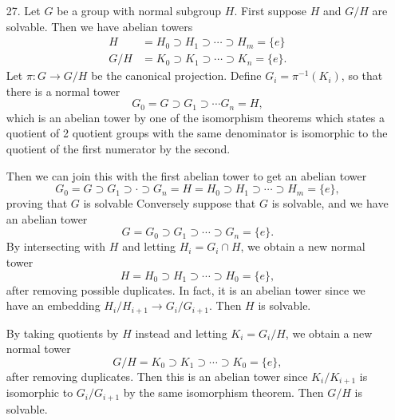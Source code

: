 \documentclass[11pt, reqno]{article}
\theoremstyle{plain}
\theoremstyle{definition}
\theoremstyle{remark}
\begin{document}
\begin{enumerate}
    \item[27.] Let $G$ be a group with normal subgroup $H$. First suppose $H$ and $G/H$ are solvable. Then
    we have abelian towers 
    \begin{align*}
        H & = H_0 \supset H_1 \supset \cdots \supset H_m = \{e\}\\
        G/H & = K_0 \supset K_1 \supset \cdots \supset K_n = \{e\}.
    \end{align*}
    Let $\pi: G \rightarrow G/H$ be the canonical projection. Define $G_i = \pi^{-1}(K_i)$, 
    so that there is a normal tower 
    \[
        G_0 = G \supset G_1 \supset \cdots G_n = H,
    \]
    which is an abelian tower by one of the isomorphism theorems which states a quotient of 
    2 quotient groups with the same denominator is isomorphic to the quotient of the first numerator 
    by the second. 

    Then we can join this with the first abelian tower to get an abelian tower 
    \[
        G_0 = G \supset G_1 \supset \cdot \supset G_n = H = H_0 \supset H_1 \supset \cdots \supset H_m = \{e\},
    \]
    proving that $G$ is solvable 
    \bigbreak
    Conversely suppose that $G$ is solvable, and we have an abelian tower 
    \[
        G = G_0 \supset G_1 \supset \cdots \supset G_n  = \{e\}.
    \]
    By intersecting with $H$ and letting $H_i = G_i \cap H$, we obtain a new normal tower 
    \[
        H = H_0 \supset H_1 \supset \cdots \supset H_0 = \{e\},
    \]
    after removing possible duplicates. In fact, it is an abelian tower since we have an embedding 
    $H_i/H_{i+1} \rightarrow G_i/G_{i+1}$. Then $H$ is solvable. 

    By taking quotients by $H$ instead and letting $K_i = G_i/H$, we obtain a new normal tower 
    \[
        G/H = K_0 \supset K_1 \supset \cdots \supset K_0 = \{e\},
    \]
    after removing duplicates. Then this is an abelian tower since $K_i / K_{i + 1}$ is isomorphic
    to $G_i / G_{i + 1}$ by the same isomorphism theorem. Then $G/H$ is solvable. 

\end{enumerate}
\end{document}
